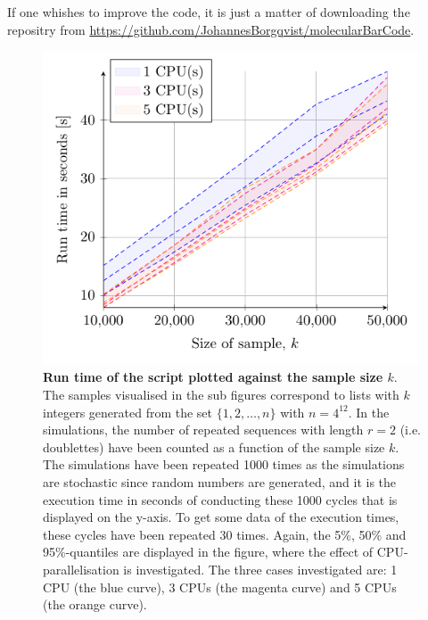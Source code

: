 \documentclass{article}
\begin{document}
If one whishes to improve the code, it is just a matter of downloading the repositry from \url{https://github.com/JohannesBorgqvist/molecularBarCode}. 

\begin{figure}[htbp!]
  \begin{center}
\includegraphics[width=\textwidth]{../Figures/Fig2/Fig2.pdf}
\caption[\textbf{Run time of the script plotted against the sample size $k$}]{\textbf{Run time of the script plotted against the sample size $k$}. The samples visualised in the sub figures correspond to lists with $k$ integers generated from the set $\{1,2,\ldots,n\}$ with $n=4^{12}$. In the simulations, the number of repeated sequences with length $r=2$ (i.e. doublettes) have been counted as a function of the sample size $k$. The simulations have been repeated 1000 times as the simulations are stochastic since random numbers are generated, and it is the execution time in seconds of conducting these 1000 cycles that is displayed on the y-axis. To get some data of the execution times, these cycles have been repeated 30 times. Again, the 5\%, 50\% and 95\%-quantiles are displayed in the figure, where the effect of CPU-parallelisation is investigated. The three cases investigated are: 1 CPU (the blue curve), 3 CPUs (the magenta curve) and 5 CPUs (the orange curve). }
\label{fig:HPC}
  \end{center}
  \end{figure}


\clearpage


\end{document}

